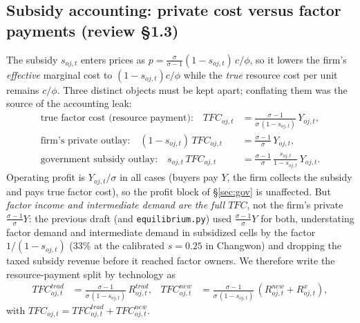 \documentclass[11pt]{article}
\begin{document}
\subsection{Subsidy accounting: private cost versus factor payments (review \S1.3)}
The subsidy $s_{oj,t}$ enters prices as $p = \frac{\sigma}{\sigma-1}(1-s_{oj,t})\,c/\phi$,
so it lowers the firm's \emph{effective} marginal cost to $(1-s_{oj,t})c/\phi$ while the
\emph{true} resource cost per unit remains $c/\phi$. Three distinct objects must be kept
apart; conflating them was the source of the accounting leak:
\begin{align}
  \text{true factor cost (resource payment):}\quad
    TFC_{oj,t} &= \frac{\sigma-1}{\sigma\,(1-s_{oj,t})}\,Y_{oj,t}, \label{eq:TFC}\\
  \text{firm's private outlay:}\quad
    (1-s_{oj,t})\,TFC_{oj,t} &= \frac{\sigma-1}{\sigma}\,Y_{oj,t}, \\
  \text{government subsidy outlay:}\quad
    s_{oj,t}\,TFC_{oj,t} &= \frac{\sigma-1}{\sigma}\,\frac{s_{oj,t}}{1-s_{oj,t}}\,Y_{oj,t}.
\end{align}
Operating profit is $Y_{oj,t}/\sigma$ in all cases (buyers pay $Y$, the firm collects the
subsidy and pays true factor cost), so the profit block of \S\ref{sec:gov} is unaffected. But
\emph{factor income and intermediate demand are the full $TFC$}, not the firm's private
$\frac{\sigma-1}{\sigma}Y$: the previous draft (and \texttt{equilibrium.py}) used
$\frac{\sigma-1}{\sigma}Y$ for both, understating factor demand and intermediate demand in
subsidized cells by the factor $1/(1-s_{oj,t})$ (33\% at the calibrated $s=0.25$ in
Changwon) and dropping the taxed subsidy revenue before it reached factor owners. We
therefore write the resource-payment split by technology as
\begin{align}
  TFC^{trad}_{oj,t} &= \frac{\sigma-1}{\sigma\,(1-s_{oj,t})}\,R^{trad}_{oj,t}, &
  TFC^{new}_{oj,t}  &= \frac{\sigma-1}{\sigma\,(1-s_{oj,t})}\,\left(R^{new}_{oj,t}+R^{x}_{oj,t}\right),
\end{align}
with $TFC_{oj,t}=TFC^{trad}_{oj,t}+TFC^{new}_{oj,t}$.
\end{document}
